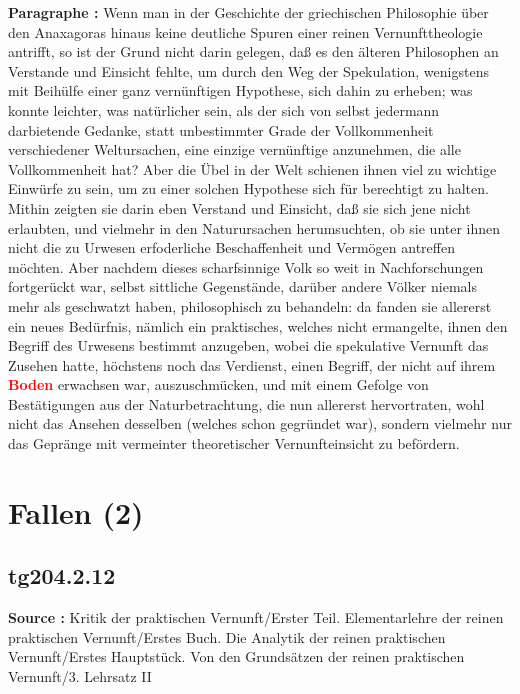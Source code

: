 \documentclass[a4paper,12pt,twoside]{book}
\newcommand{\match}[1]{\textcolor{red}{\textbf{#1}}}
\newcommand{\unnumberedsection}[1]{
	\section*{#1}
	\addcontentsline{toc}{section}{#1}
	\markright{#1}
}
\begin{document}
	\noindent\textbf{Paragraphe : }Wenn man in der Geschichte der griechischen Philosophie über den Anaxagoras hinaus keine deutliche Spuren einer reinen Vernunfttheologie antrifft, so ist der Grund nicht darin gelegen, daß es den älteren Philosophen an Verstande und Einsicht fehlte, um durch den Weg der Spekulation, wenigstens mit Beihülfe einer ganz vernünftigen Hypothese, sich dahin zu erheben; was konnte leichter, was natürlicher sein, als der sich von selbst jedermann darbietende Gedanke, statt unbestimmter Grade der Vollkommenheit verschiedener Weltursachen, eine einzige vernünftige anzunehmen, die alle Vollkommenheit hat? Aber die Übel in der Welt schienen ihnen viel zu wichtige Einwürfe zu sein, um zu einer solchen Hypothese sich für berechtigt zu halten. Mithin zeigten sie darin eben Verstand und Einsicht, daß sie sich jene nicht erlaubten, und vielmehr in den Naturursachen herumsuchten, ob sie unter ihnen nicht die zu Urwesen erfoderliche Beschaffenheit und Vermögen antreffen möchten. Aber nachdem dieses scharfsinnige Volk so weit in Nachforschungen fortgerückt war, selbst sittliche Gegenstände, darüber andere Völker niemals mehr als geschwatzt haben, philosophisch zu behandeln: da fanden sie allererst ein neues Bedürfnis, nämlich ein praktisches, welches nicht ermangelte, ihnen den Begriff des Urwesens bestimmt anzugeben, wobei die spekulative Vernunft das Zusehen hatte, höchstens noch das Verdienst, einen Begriff, der nicht auf ihrem \match{Boden} erwachsen war, auszuschmücken, und mit einem Gefolge von Bestätigungen aus der Naturbetrachtung, die nun allererst hervortraten, wohl nicht das Ansehen desselben (welches schon gegründet war), sondern vielmehr nur das Gepränge mit vermeinter theoretischer Vernunfteinsicht zu befördern. 
	
	\unnumberedsection{Fallen (2)} 
	\subsection*{tg204.2.12} 
	\textbf{Source : }Kritik der praktischen Vernunft/Erster Teil. Elementarlehre der reinen praktischen Vernunft/Erstes Buch. Die Analytik der reinen praktischen Vernunft/Erstes Hauptstück. Von den Grundsätzen der reinen praktischen Vernunft/3. Lehrsatz II\\  
	
\end{document}
